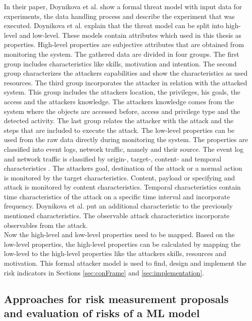 In their paper, Doynikova et al. \cite{DBLP:conf/crisis/DoynikovaNGK20} show a formal threat model with input data for experiments, the data handling process and describe the experiment
that was executed. Doynikova et al. explain that the threat model can be split into high-level and low-level. These models contain attributes which used in this thesis as properties.
High-level properties are subjective attributes that are obtained from monitoring the system. The gathered data are divided in four groups. The first group includes characteristics like
skills, motivation and intention. The second group characterizes the attackers capabilities and show the characteristics as used resources. The third group incorporates the attacker in
relation with the attacked system. This group includes the attackers location, the privileges, his goals, the access and the attackers knowledge. The attackers knowledge comes from the
system where the objects are accessed before, access and privilege type and the detected activity. The last group relates the attacker with the attack and the steps that are included to
execute the attack. The low-level properties can be used from the raw data directly during monitoring the system. The properties are classified into event logs, network traffic, namely
and their source. The event log and network traffic is classified by origin-, target-, content- and temporal characteristics \cite{DBLP:journals/ijcysa/FraunholzKAS17}. The attackers
goal, destination of the attack or a normal action is monitored by the target characteristics. Content, payload or specifying and attack is monitored by content characteristics. Temporal
characteristics contain time characteristics of the attack on a specific time interval and incorporate frequency. Doynikova et al. put an additional characteristic to the previously
mentioned characteristics. The observable attack characteristics incorporate observables from the attack. \\
Now the high-level and low-level properties need to be mapped. Based on the low-level properties, the high-level properties can be calculated by mapping the low-level to the high-level
properties like the attackers skills, resources and motivation. This formal attacker model is used to find, design and implement the risk indicators in Sections \ref{sec:conFrame} and
\ref{sec:implementation}.

\subsection{Approaches for risk measurement proposals and evaluation of risks of a ML model}
\label{sec:approaches}


